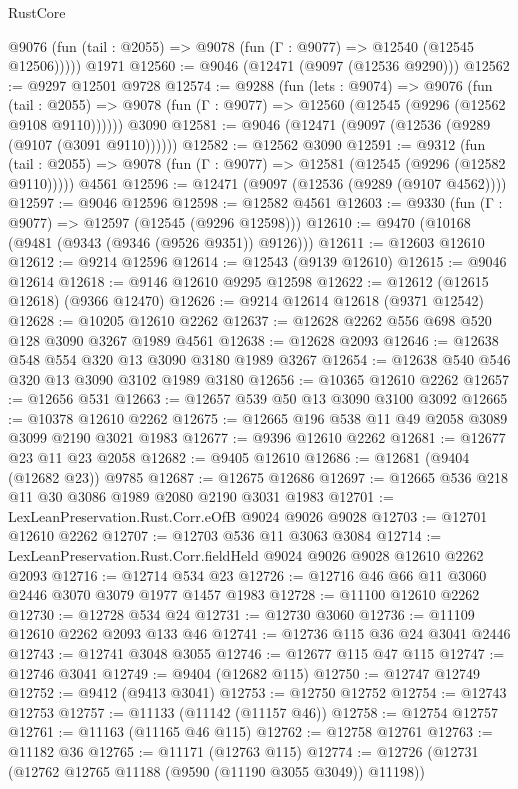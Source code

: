 \begin{lexlean}{RustCore}
\begin{coremodule}
      @9076 (fun (tail : @2055) => @9078 (fun (Γ : @9077) => @12540 (@12545 @12506)))))
    @1971
@12560 := @9046 (@12471 (@9097 (@12536 @9290)))
@12562 := @9297 @12501 @9728
@12574 := @9288
    (fun (lets : @9074) =>
    @9076
      (fun (tail : @2055) =>
      @9078 (fun (Γ : @9077) => @12560 (@12545 (@9296 (@12562 @9108 @9110))))))
    @3090
@12581 := @9046 (@12471 (@9097 (@12536 (@9289 (@9107 (@3091 @9110))))))
@12582 := @12562 @3090
@12591 := @9312
    (fun (tail : @2055) => @9078 (fun (Γ : @9077) => @12581 (@12545 (@9296 (@12582 @9110)))))
    @4561
@12596 := @12471 (@9097 (@12536 (@9289 (@9107 @4562))))
@12597 := @9046 @12596
@12598 := @12582 @4561
@12603 := @9330 (fun (Γ : @9077) => @12597 (@12545 (@9296 @12598)))
@12610 := @9470 (@10168 (@9481 (@9343 (@9346 (@9526 @9351)) @9126)))
@12611 := @12603 @12610
@12612 := @9214 @12596
@12614 := @12543 (@9139 @12610)
@12615 := @9046 @12614
@12618 := @9146 @12610 @9295 @12598
@12622 := @12612 (@12615 @12618) (@9366 @12470)
@12626 := @9214 @12614 @12618 (@9371 @12542)
@12628 := @10205 @12610 @2262
@12637 := @12628 @2262 @556 @698 @520 @128 @3090 @3267 @1989 @4561
@12638 := @12628 @2093
@12646 := @12638 @548 @554 @320 @13 @3090 @3180 @1989 @3267
@12654 := @12638 @540 @546 @320 @13 @3090 @3102 @1989 @3180
@12656 := @10365 @12610 @2262
@12657 := @12656 @531
@12663 := @12657 @539 @50 @13 @3090 @3100 @3092
@12665 := @10378 @12610 @2262
@12675 := @12665 @196 @538 @11 @49 @2058 @3089 @3099 @2190 @3021 @1983
@12677 := @9396 @12610 @2262
@12681 := @12677 @23 @11 @23 @2058
@12682 := @9405 @12610
@12686 := @12681 (@9404 (@12682 @23)) @9785
@12687 := @12675 @12686
@12697 := @12665 @536 @218 @11 @30 @3086 @1989 @2080 @2190 @3031 @1983
@12701 := LexLeanPreservation.Rust.Corr.eOfB @9024 @9026 @9028
@12703 := @12701 @12610 @2262
@12707 := @12703 @536 @11 @3063 @3084
@12714 := LexLeanPreservation.Rust.Corr.fieldHeld @9024 @9026 @9028 @12610 @2262 @2093
@12716 := @12714 @534 @23
@12726 := @12716 @46 @66 @11 @3060 @2446 @3070 @3079 @1977 @1457 @1983
@12728 := @11100 @12610 @2262
@12730 := @12728 @534 @24
@12731 := @12730 @3060
@12736 := @11109 @12610 @2262 @2093 @133 @46
@12741 := @12736 @115 @36 @24 @3041 @2446
@12743 := @12741 @3048 @3055
@12746 := @12677 @115 @47 @115
@12747 := @12746 @3041
@12749 := @9404 (@12682 @115)
@12750 := @12747 @12749
@12752 := @9412 (@9413 @3041)
@12753 := @12750 @12752
@12754 := @12743 @12753
@12757 := @11133 (@11142 (@11157 @46))
@12758 := @12754 @12757
@12761 := @11163 (@11165 @46 @115)
@12762 := @12758 @12761
@12763 := @11182 @36
@12765 := @11171 (@12763 @115)
@12774 := @12726 (@12731 (@12762 @12765 @11188 (@9590 (@11190 @3055 @3049)) @11198))

\end{coremodule}
\end{lexlean}

